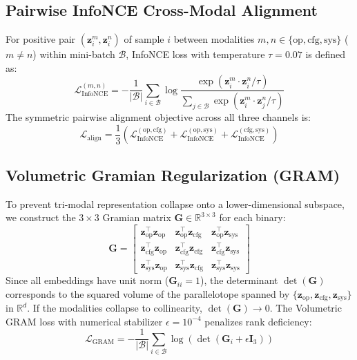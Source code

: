 \documentclass[pdflatex,sn-mathphys-num]{sn-jnl}
\begin{document}
\subsection{Pairwise InfoNCE Cross-Modal Alignment}\label{sec:math_infonce}
For positive pair $(\mathbf{z}_i^m, \mathbf{z}_i^n)$ of sample $i$ between modalities $m, n \in \{\text{op}, \text{cfg}, \text{sys}\}$ ($m \neq n$) within mini-batch $\mathcal{B}$, InfoNCE loss with temperature $\tau = 0.07$ is defined as:
\begin{equation}
\mathcal{L}_{\text{InfoNCE}}^{(m, n)} = -\frac{1}{|\mathcal{B}|} \sum_{i \in \mathcal{B}} \log \frac{\exp\left(\mathbf{z}_i^m \cdot \mathbf{z}_i^n / \tau\right)}{\sum_{j \in \mathcal{B}} \exp\left(\mathbf{z}_i^m \cdot \mathbf{z}_j^n / \tau\right)}
\end{equation}
The symmetric pairwise alignment objective across all three channels is:
\begin{equation}
\mathcal{L}_{\text{align}} = \frac{1}{3}\left(\mathcal{L}_{\text{InfoNCE}}^{(\text{op}, \text{cfg})} + \mathcal{L}_{\text{InfoNCE}}^{(\text{op}, \text{sys})} + \mathcal{L}_{\text{InfoNCE}}^{(\text{cfg}, \text{sys})}\right)
\end{equation}

\subsection{Volumetric Gramian Regularization (GRAM)}\label{sec:math_gram}
To prevent tri-modal representation collapse onto a lower-dimensional subspace, we construct the $3 \times 3$ Gramian matrix $\mathbf{G} \in \mathbb{R}^{3 \times 3}$ for each binary:
\begin{equation}
\mathbf{G} = \begin{bmatrix}
\mathbf{z}_{\text{op}}^\top \mathbf{z}_{\text{op}} & \mathbf{z}_{\text{op}}^\top \mathbf{z}_{\text{cfg}} & \mathbf{z}_{\text{op}}^\top \mathbf{z}_{\text{sys}} \\
\mathbf{z}_{\text{cfg}}^\top \mathbf{z}_{\text{op}} & \mathbf{z}_{\text{cfg}}^\top \mathbf{z}_{\text{cfg}} & \mathbf{z}_{\text{cfg}}^\top \mathbf{z}_{\text{sys}} \\
\mathbf{z}_{\text{sys}}^\top \mathbf{z}_{\text{op}} & \mathbf{z}_{\text{sys}}^\top \mathbf{z}_{\text{cfg}} & \mathbf{z}_{\text{sys}}^\top \mathbf{z}_{\text{sys}}
\end{bmatrix}
\end{equation}
Since all embeddings have unit norm ($\mathbf{G}_{ii} = 1$), the determinant $\det(\mathbf{G})$ corresponds to the squared volume of the parallelotope spanned by $\{\mathbf{z}_{\text{op}}, \mathbf{z}_{\text{cfg}}, \mathbf{z}_{\text{sys}}\}$ in $\mathbb{R}^{d}$. If the modalities collapse to collinearity, $\det(\mathbf{G}) \to 0$. The Volumetric GRAM loss with numerical stabilizer $\epsilon = 10^{-4}$ penalizes rank deficiency:
\begin{equation}
\mathcal{L}_{\text{GRAM}} = -\frac{1}{|\mathcal{B}|} \sum_{i \in \mathcal{B}} \log\left(\det(\mathbf{G}_i + \epsilon \mathbf{I}_3)\right)
\end{equation}
\end{document}
